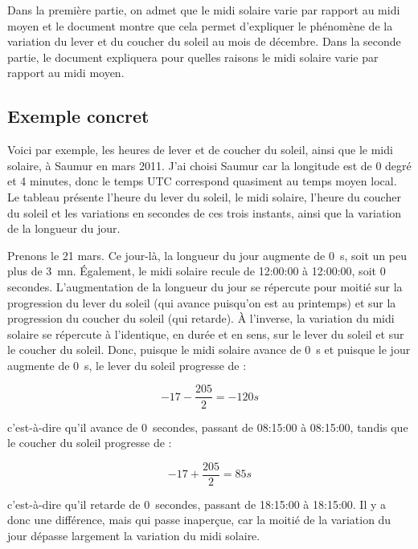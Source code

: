 \documentclass[a4paper]{article}
\newenvironment{texte}{\rmfamily}{}
\newcommand{\veilaubehhmmss}[0]{08:15:00}
\newcommand{\jouraubehhmmss}[0]{08:15:00}
\newcommand{\veilmidihhmmss}[0]{12:00:00}
\newcommand{\jourmidihhmmss}[0]{12:00:00}
\newcommand{\veilsoirhhmmss}[0]{18:15:00}
\newcommand{\joursoirhhmmss}[0]{18:15:00}
\newcommand{\deltalumi}[0]{0}
\newcommand{\deltaaube}[0]{0}
\newcommand{\deltamidi}[0]{0}
\newcommand{\deltasoir}[0]{0}
\begin{document}
\begin{texte}
Dans la première partie, on admet que le midi solaire varie par rapport
au midi moyen et le document montre que cela permet d'expliquer le phénomène
de la variation du lever et du coucher du soleil au mois de décembre.
Dans la seconde partie, le document expliquera pour quelles
raisons le midi solaire varie par rapport au midi moyen.

\subsection{Exemple concret}

Voici par exemple, les heures de lever et de coucher du soleil, ainsi
que le midi solaire, à Saumur en mars 2011. J'ai choisi Saumur car la
longitude est de 0 degré et 4 minutes, donc le temps UTC correspond
quasiment au temps moyen local. Le tableau présente l'heure du lever
du soleil, le midi solaire, l'heure du coucher du soleil et les variations
en secondes de ces trois instants, ainsi que la variation de la longueur
du jour.

\vspace{2mm}
\vspace{2mm}

Prenons le 21 mars. Ce jour-là, la longueur du jour augmente de \deltalumi~s,
soit un peu plus de 3~mn. Également, le midi solaire recule de
\veilmidihhmmss{} à \jourmidihhmmss{}, soit \deltamidi{} secondes.
L'augmentation de la longueur du jour se répercute pour
moitié sur la progression du lever du soleil (qui avance puisqu'on est
au printemps) et sur la progression du coucher du soleil (qui retarde).
À l'inverse, la variation du midi solaire se répercute à l'identique,
en durée et en sens, sur le lever du soleil et sur le coucher du
soleil. Donc, puisque le midi solaire avance de \deltamidi~s et puisque
le jour augmente de \deltalumi~s, le lever du soleil progresse de :

\[ -17 - \frac{205}{2} = -120 s \]

c'est-à-dire qu'il avance de \deltaaube~secondes,
passant de \veilaubehhmmss{} à \jouraubehhmmss,
tandis que le coucher du soleil progresse de :

\[ -17 + \frac{205}{2} = 85 s \]

c'est-à-dire qu'il retarde de \deltasoir~secondes, passant de \veilsoirhhmmss{} à
\joursoirhhmmss. Il y a donc une différence, mais qui passe inaperçue, car la
moitié de la variation du jour dépasse largement la variation du midi
solaire.


\end{texte}
\end{document}
